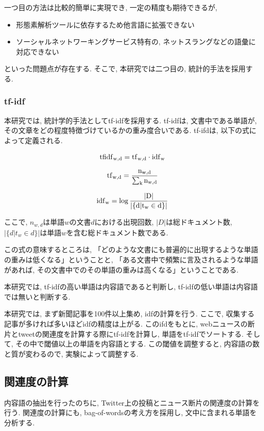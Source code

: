 \documentclass[12pt]{jarticle}
\begin{document}
一つ目の方法は比較的簡単に実現でき, 一定の精度も期待できるが,
\begin{itemize}
  \item 形態素解析ツールに依存するため他言語に拡張できない
  \item ソーシャルネットワーキングサービス特有の, ネットスラングなどの語彙に対応できない
\end{itemize}
といった問題点が存在する. そこで, 本研究では二つ目の, 統計的手法を採用する.

\subsubsection{tf-idf}
本研究では, 統計学的手法としてtf-idf\cite{tfidf}を採用する. tf-idfは, 文書中である単語が, その文章をどの程度特徴づけているかの重み度合いである. tf-ifdは, 以下の式によって定義される.

\begin{equation}
  \rm{tfidf}_{w,d} = \rm{tf}_{w,d} \cdot \rm{idf}_{w}
\end{equation}

\begin{equation}
  \rm{tf}_{w, d} = \frac{n_{w,d}}{\sum_k n_{w,d}}
\end{equation}

\begin{equation}
  \rm{idf}_{w} = \log{\frac{|D|}{|\{d|t_w \in d\}|}}
\end{equation}

ここで, $n_{w,d}$は単語$w$の文書$d$における出現回数, $|D|$は総ドキュメント数, $|\{d|t_w \in d\}|$は単語$w$を含む総ドキュメント数である.

この式の意味するところは, 「どのような文書にも普遍的に出現するような単語の重みは低くなる」ということと, 「ある文書中で頻繁に言及されるような単語があれば, その文書中でのその単語の重みは高くなる」ということである.

本研究では, tf-idfの高い単語は内容語であると判断し, tf-idfの低い単語は内容語では無いと判断する.

本研究では, まず新聞記事を100件以上集め, idfの計算を行う. ここで, 収集する記事が多ければ多いほどidfの精度は上がる. このifdをもとに, webニュースの断片とtweetの関連度を計算する際にtf-idfを計算し, 単語をtf-idfでソートする. そして, その中で閾値以上の単語を内容語とする. この閾値を調整すると, 内容語の数と質が変わるので, 実験によって調整する.

\subsection{関連度の計算}
内容語の抽出を行ったのちに, Twitter上の投稿とニュース断片の関連度の計算を行う. 関連度の計算にも, bag-of-wordsの考え方を採用し, 文中に含まれる単語を分析する.
\end{document}
